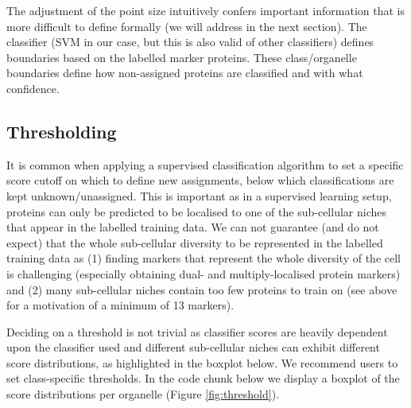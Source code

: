 The adjustment of the point size intuitively confers important
information that is more difficult to define formally (we
will address in the next section). The classifier (SVM in our case, but
this is also valid of other classifiers) defines boundaries based on
the labelled marker proteins. These class/organelle boundaries define
how non-assigned proteins are classified and with what confidence.

\subsection*{Thresholding}\label{sec:thresholding}

It is common when applying a supervised classification algorithm to
set a specific score cutoff on which to define new assignments, below
which classifications are kept unknown/unassigned. This is important
as in a supervised learning setup, proteins can only be predicted to
be localised to one of the sub-cellular niches that appear in the
labelled training data. We can not guarantee (and do not expect) that
the whole sub-cellular diversity to be represented in the labelled
training data as (1) finding markers that represent the whole
diversity of the cell is challenging (especially obtaining dual- and
multiply-localised protein markers) and (2) many sub-cellular niches
contain too few proteins to train on (see above for a motivation of a
minimum of 13 markers).

Deciding on a threshold is not trivial as classifier scores are
heavily dependent upon the classifier used and different sub-cellular
niches can exhibit different score distributions, as highlighted in
the boxplot below. We recommend users to set class-specific
thresholds.  In the code chunk below we display a boxplot of the score
distributions per organelle (Figure \ref{fig:threshold}).

